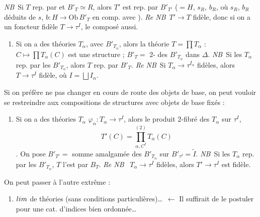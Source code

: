 \documentclass[11pt,a4paper]{article}
\begin{document}
\emph{NB}\ Si $T$ rep. par   et $B'_{T}
\simeq R$, alors $T'$ est rep. par $B'_{T'}$  ($= H$, $s_{R}$, $b_{R}$, où $s_{R}$, $b_{R}$ déduits de
$s$, $b : H \to \mathrm{Ob}\,B'_{T}$ en comp. avec \ill{}).
\emph{Re NB}\ $T' \to T$ fidèle, donc si on a un foncteur fidèle
$T \to \tau^{I}$, le composé aussi.

\begin{enumerate}
  \item[d)] [composition de structures] Si on a des théories
    $T_{\alpha}$, avec $B'_{T_{\alpha}}$, alors la théorie $T = \prod
    T_{\alpha}$ : $C \mapsto \prod T_{\alpha}(C)$ est une structure
     ; $B'_{T} = $ 2- des
    $B'_{T_{\alpha}}$ dans $\Delta$. \emph{NB}\ Si les $T_{\alpha}$
    rep. par les $B'_{T_{\alpha}}$, alors $T$ rep. par $B'_{T}$.
    \emph{Re NB}\ Si $T_{\alpha} \to \tau^{I_{\alpha}}$ fidèles,
    alors $T \to \tau^{I}$ fidèle, où $I = \bigsqcup I_{\alpha}$.
\end{enumerate}

Si on préfère ne pas changer en cours de route des objets de base, on
peut vouloir se restreindre aux compositions de structures avec objets de
base fixés :

\begin{enumerate}
  \item[d')] Si on a des théories $T_{\alpha}$  $\varphi_{\alpha} : T_{\alpha} \to \tau^{I}$, alors le
    produit 2-fibré des $T_{\alpha}$ sur $\tau^{I}$,
    \[
      T'(C) = \prod^{(2)}_{\alpha, C^{I}} T_{\alpha}(C)
    \]
    . On pose $B'_{T'} = $ \struck{\ill{}}
    somme amalgamée des $B'_{T_{\alpha}}$ sur $B'_{\tau^{I}} = \tilde{I}$.
    \emph{NB}\ Si les $T_{\alpha}$ rep. par les $B'_{T_{\alpha}}$,
    $T$ l'est par $B_{T}$. \emph{Re NB}\ \ill{} \ill{} $T_{\alpha}
    \to \tau^{I}$ fidèles, alors $T' \to \tau^{I}$ est fidèle.
\end{enumerate}

On peut passer à l'autre extrême :

\begin{enumerate}
  \item[d'')] $\varprojlim$ de théories (sans conditions
    particulières)…\ $\leftarrow$ Il suffirait de le postuler pour
    une cat. d'indices bien ordonnée…
\end{enumerate}
\end{document}
